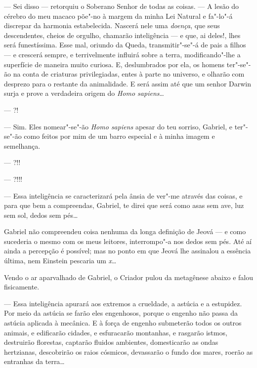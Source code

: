 --- Sei disso --- retorquiu o Soberano Senhor de todas as coisas. --- A
lesão do cérebro do meu macaco põe"-no à margem da minha Lei Natural e
fa"-lo"-á discrepar da harmonia estabelecida. Nascerá nele uma
\emph{doença}, que seus descendentes, cheios de orgulho, chamarão
inteligência --- e que, ai deles!, lhes será funestíssima. Esse mal,
oriundo da Queda, transmitir"-se"-á de pais a filhos --- e crescerá
sempre, e terrivelmente influirá sobre a terra, modificando"-lhe a
superfície de maneira muito curiosa. E, deslumbrados por ela, os homens
ter"-se"-ão na conta de criaturas privilegiadas, entes à parte no
universo, e olharão com desprezo para o restante da animalidade. E será
assim até que um senhor Darwin surja e prove a verdadeira origem do
\emph{Homo sapiens}\ldots{}

--- ?!

--- Sim. Eles nomear"-se"-ão \emph{Homo sapiens} apesar do teu sorriso,
Gabriel, e ter"-se"-ão como feitos por mim de um barro especial e à minha
imagem e semelhança.

--- ?!!


--- ?!!!

--- Essa inteligência se caracterizará pela ânsia de ver"-me através das
coisas, e para que bem a compreendas, Gabriel, te direi que será como
asas sem ave, luz sem sol, dedos sem pés\ldots{}

Gabriel não compreendeu coisa nenhuma da longa definição de Jeová --- e
como sucederia o mesmo com os meus leitores, interrompo"-a nos dedos sem
pés. Até aí ainda a percepção é possível; mas no ponto em que Jeová lhe
assinalou a essência última, nem Einstein pescaria um \emph{x}\ldots{}

Vendo o ar aparvalhado de Gabriel, o Criador pulou da metagênese abaixo
e falou fisicamente.

--- Essa inteligência apurará aos extremos a crueldade, a astúcia e a
estupidez. Por meio da astúcia se farão eles engenhosos, porque o
engenho não passa da astúcia aplicada à mecânica. E à força de engenho
submeterão todos os outros animais, e edificarão cidades, e esfuracarão
montanhas, e rasgarão istmos, destruirão florestas, captarão fluidos
ambientes, domesticarão as ondas hertzianas, descobrirão os raios
cósmicos, devassarão o fundo dos mares, roerão as entranhas da terra\ldots{}

